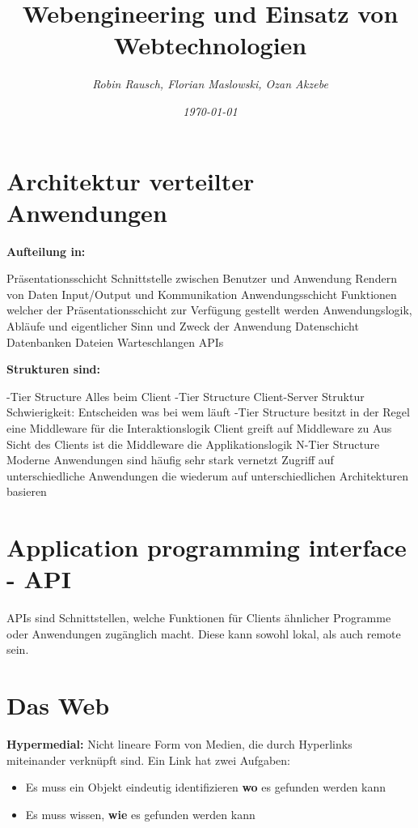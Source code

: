 \documentclass[12pt,a4paper]{article}
\author{\slshape Robin Rausch, Florian Maslowski, Ozan Akzebe}
\title{Webengineering und Einsatz von Webtechnologien}
\date{\slshape \today}
\begin{document}
\maketitle
\tableofcontents
\newpage

\section{Architektur verteilter Anwendungen}
\textbf{Aufteilung in:}
\begin{outline}
	\1 Präsentationsschicht
		\2 Schnittstelle zwischen Benutzer und Anwendung
		\2 Rendern von Daten
		\2 Input/Output und Kommunikation
	\1 Anwendungsschicht
		\2 Funktionen welcher der Präsentationsschicht zur Verfügung gestellt werden
		\2 Anwendungslogik, Abläufe und eigentlicher Sinn und Zweck der Anwendung
	\1 Datenschicht
		\2 Datenbanken
		\2 Dateien
		\2 Warteschlangen
		\2 APIs
\end{outline}
\textbf{Strukturen sind:}
\begin{outline}
	-Tier Structure
		\2 Alles beim Client
	-Tier Structure
		\2 Client-Server Struktur
		\2 Schwierigkeit: Entscheiden was bei wem läuft
	-Tier Structure
		\2 besitzt in der Regel eine Middleware für die Interaktionslogik
		\2 Client greift auf Middleware zu
		\2 Aus Sicht des Clients ist die Middleware die Applikationslogik
	\1 N-Tier Structure
		\2 Moderne Anwendungen sind häufig sehr stark vernetzt
		\2 Zugriff auf unterschiedliche Anwendungen die wiederum auf unterschiedlichen Architekturen basieren
\end{outline}

\section{Application programming interface - API}
APIs sind Schnittstellen, welche Funktionen für Clients ähnlicher Programme oder Anwendungen zugänglich macht. Diese kann sowohl lokal, als auch remote sein.

\section{Das Web}
\textbf{Hypermedial:} Nicht lineare Form von Medien, die durch Hyperlinks miteinander verknüpft sind.\newline
Ein Link hat zwei Aufgaben:
\begin{itemize}
	\item Es muss ein Objekt eindeutig identifizieren \textbf{wo} es gefunden werden kann
	\item Es muss wissen, \textbf{wie} es gefunden werden kann
\end{itemize}
\end{document}
